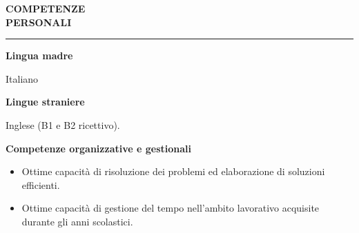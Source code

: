 \hspace{5mm}
\begin{minipage}[b]{0.3\textwidth}
	\textbf{COMPETENZE \\PERSONALI}
\end{minipage}%
\hfill
\hfill
\begin{minipage}[t]{0.6\textwidth}		
	\rule{\textwidth}{0.4pt}
\end{minipage}%
\vspace{5mm}


\begin{minipage}[t]{0.3\textwidth}
	\textbf{Lingua madre}
\end{minipage}%
\hfill
\hfill
\begin{minipage}[t]{0.6\textwidth}		
	Italiano
	\vspace{4mm}
\end{minipage}%


\begin{minipage}[t]{0.3\textwidth}
	\textbf{Lingue straniere}
\end{minipage}%
\hfill
\hfill
\begin{minipage}[t]{0.6\textwidth}		
	Inglese (B1 e B2 ricettivo).
	\vspace{4mm}
\end{minipage}%


\begin{minipage}[t]{0.3\textwidth}
	\textbf{Competenze organizzative e gestionali}
\end{minipage}%
\hfill
\hfill
\begin{minipage}[t]{0.6\textwidth}		
	\begin{itemize}
		\item Ottime capacità di risoluzione dei problemi ed elaborazione di soluzioni efficienti.
		\item Ottime capacità di gestione del tempo nell'ambito lavorativo acquisite durante gli anni scolastici.
	\end{itemize}
	\vspace{4mm}
\end{minipage}%